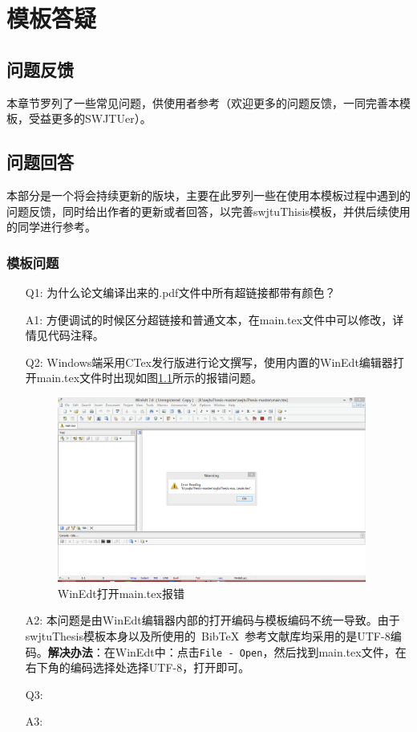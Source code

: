 \chapter{模板答疑}

\section{问题反馈}
\label{sec:contact}
本章节罗列了一些常见问题，供使用者参考（欢迎更多的问题反馈，一同完善本模板，受益更多的SWJTUer）。

\section{问题回答}
本部分是一个将会持续更新的版块，主要在此罗列一些在使用本模板过程中遇到的问题反馈，同时给出作者的更新或者回答，以完善swjtuThisis模板，并供后续使用的同学进行参考。

\subsection{模板问题}
\begin{enumerate}
	\item[Q1:]为什么论文编译出来的.pdf文件中所有超链接都带有颜色？
	\item[A1:]方便调试的时候区分超链接和普通文本，在main.tex文件中可以修改，详情见代码注释。
	\item[Q2:]Windows端采用CTex发行版进行论文撰写，使用内置的WinEdt编辑器打开main.tex文件时出现如图\ref{Q151208_1_Yang}所示的报错问题。
	\begin{figure}[htbp]
		\centering
		\includegraphics[width=4in]{figures/QA/Q151208_1_Yang.png}
		\caption{WinEdt打开main.tex报错}
		\label{Q151208_1_Yang}
	\end{figure}
	\item[A2:]本问题是由WinEdt编辑器内部的打开编码与模板编码不统一导致。由于swjtuThesis模板本身以及所使用的~BibTeX{}~参考文献库均采用的是UTF-8编码。\textbf{解决办法}：在WinEdt中：点击\verb|File - Open|，然后找到main.tex文件，在右下角的编码选择处选择UTF-8，打开即可。
	\item[Q3:]
	\item[A3:]
\end{enumerate}


